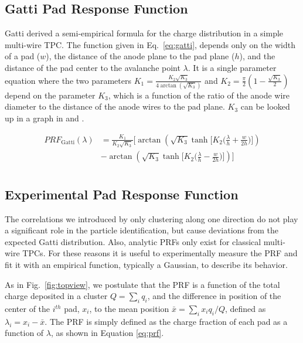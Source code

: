 \documentclass[review]{elsarticle}
\begin{document}
\subsection{Gatti Pad Response Function}
Gatti \cite{gatti} derived a semi-empirical formula for the charge distribution in a simple multi-wire TPC. The function given in Eq.~\ref{eq:gatti}, depends only on the width of a pad ($w$), the distance of the anode plane to the pad plane ($h$), and the distance of the pad center to the avalanche point $\lambda$. It is a single parameter equation where the two parameters $K_1 = \frac{K_{2}\sqrt{K_3}}{4 \arctan(\sqrt{K_3})}$ and $K_2 = \frac{\pi}{2}\left(1-\frac{\sqrt{K_{3}}}{2}\right)$ depend on the parameter $K_3$, which is a function of the ratio of the anode wire diameter to the distance of the anode wires to the pad plane. $K_3$ can be looked up in a graph in \cite{blumrol} and \citep{gatti}.

\begin{equation}\label{eq:gatti}
\begin{split}
PRF_{\mathrm{Gatti}}(\lambda)
& = \frac{K_{1}}{K_{2}\sqrt{K_{3}}}\bigl[\arctan(\sqrt{K_{3}}\tanh\bigl[K_{2}\bigl(\frac{\lambda}{h}+\frac{w}{2h}\bigr)\bigr]) \\
& - \arctan(\sqrt{K_{3}}\tanh\bigl[K_{2}\bigl(\frac{\lambda}{h}-\frac{w}{2h}\bigr)\bigr])\bigr] \\
\end{split}
\end{equation}

\subsection{Experimental Pad Response Function}

The correlations we introduced by only clustering along one direction do not play a significant role in the particle identification, but cause deviations from the expected Gatti distribution. Also, analytic PRFs only exist for classical multi-wire TPCs. For these reasons it is useful to experimentally measure the PRF and fit it with an empirical function, typically a Gaussian, to describe its behavior. 

As in Fig.~\ref{fig:topview}, we postulate that the PRF is a function of the total charge deposited in a cluster $Q = \sum_i q_i$, and the difference in position of the center of the $i^{th}$ pad, $x_i$, to the mean position $\bar{x} = \sum_i x_i q_i/Q$, defined as $\lambda_i = x_i-\bar{x}$. The PRF is simply defined as the charge fraction of each pad as a function of $\lambda$, as shown in Equation \ref{eq:prf}. 
\end{document}
